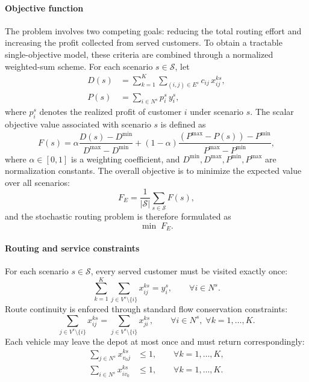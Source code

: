 \documentclass[pdflatex]{sn-jnl}
\begin{document}
\paragraph{Objective function}
The problem involves two competing goals: reducing the total routing effort and increasing the profit collected from served customers.
To obtain a tractable single-objective model, these criteria are combined through a normalized weighted-sum scheme.
For each scenario $s\in\mathcal{S}$, let
\begin{align}
\label{eq:distance_journal}
D(s) &= \sum_{k=1}^{K}\sum_{(i,j)\in E^s} c_{ij}\,x_{ij}^{ks},\\
\label{eq:profit_journal}
P(s) &= \sum_{i\in N^s} p_i^s\,y_i^s,
\end{align}
where $p_i^s$ denotes the realized profit of customer $i$ under scenario $s$.
The scalar objective value associated with scenario $s$ is defined as
\begin{equation}
\label{eq:scenario_weighted_journal}
F(s)=
\alpha \frac{D(s)-D^{\min}}{D^{\max}-D^{\min}}
+
(1-\alpha)\frac{(P^{\max}-P(s))-P^{\min}}{P^{\max}-P^{\min}},
\end{equation}
where $\alpha\in[0,1]$ is a weighting coefficient, and
$D^{\min},D^{\max},P^{\min},P^{\max}$ are normalization constants.
The overall objective is to minimize the expected value over all scenarios:
\begin{equation}
\label{eq:expected_objective_journal}
F_E=\frac{1}{|\mathcal{S}|}\sum_{s\in\mathcal{S}} F(s),
\end{equation}
and the stochastic routing problem is therefore formulated as
\begin{equation}
\label{eq:main_model_journal}
\min \; F_E.
\end{equation}

\paragraph{Routing and service constraints}
For each scenario $s\in\mathcal{S}$, every served customer must be visited exactly once:
\begin{equation}
\label{eq:visit_once_journal}
\sum_{k=1}^{K}\sum_{j\in V^s\setminus\{i\}} x_{ij}^{ks}=y_i^s,
\qquad \forall i\in N^s.
\end{equation}
Route continuity is enforced through standard flow conservation constraints:
\begin{equation}
\label{eq:flow_journal}
\sum_{j\in V^s\setminus\{i\}} x_{ij}^{ks}
=
\sum_{j\in V^s\setminus\{i\}} x_{ji}^{ks},
\qquad \forall i\in N^s,\; \forall k=1,\dots,K.
\end{equation}
Each vehicle may leave the depot at most once and must return correspondingly:
\begin{align}
\label{eq:depot_leave_journal}
\sum_{j\in N^s} x_{v_0j}^{ks} &\le 1,
\qquad \forall k=1,\dots,K,\\
\label{eq:depot_back_journal}
\sum_{i\in N^s} x_{iv_0}^{ks} &\le 1,
\qquad \forall k=1,\dots,K.
\end{align}
\end{document}
